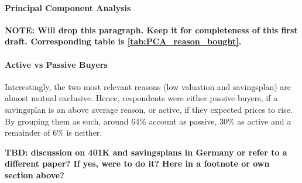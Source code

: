 \documentclass[ProjectABM]{subfiles}
\begin{document}

\paragraph{Principal Component Analysis}
\textbf{NOTE: Will drop this paragraph. Keep it for completeness of this first draft. Corresponding table is \ref{tab:PCA_reason_bought}.}



\paragraph{Active vs Passive Buyers}
Interestingly, the two most relevant reasons (low valuation and savingsplan) are almost mutual exclusive. Hence, respondents were either passive buyers, if a savingsplan is an above average reason, or active, if they expected prices to rise. By grouping them as such, around 64\% account as passive, 30\% as active and a remainder of 6\% is neither.


\textbf{TBD: discussion on 401K and savingsplans in Germany or refer to a different paper? If yes, were to do it? Here in a footnote or own section above?}
\end{document}
